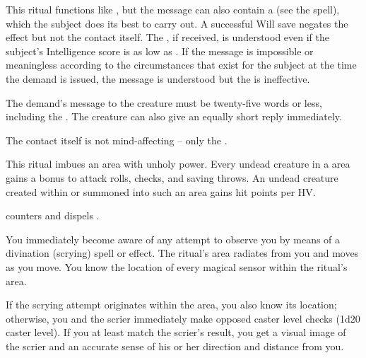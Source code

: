 \begin{spelleffect}
This ritual functions like , but the message can also contain a  (see the  spell), which the subject does its best to carry out. A successful Will save negates the  effect but not the contact itself. The , if received, is understood even if the subject's Intelligence score is as low as . If the message is impossible or meaningless according to the circumstances that exist for the subject at the time the demand is issued, the message is understood but the  is ineffective.
\par The demand's message to the creature must be twenty-five words or less, including the . The creature can also give an equally short reply immediately.
\end{spelleffect}
\begin{spellnotes}
The contact itself is not mind-affecting -- only the .
\end{spellnotes}

\spellrng{\rngclose}
\begin{spelleffect}
This ritual imbues an area with unholy power. Every undead creature in a  area gains a  bonus to attack rolls, checks, and saving throws. An undead creature created within or summoned into such an area gains  hit points per HV.
\end{spelleffect}
\begin{spellnotes}
 counters and dispels .
\end{spellnotes}

\spelldur{\durext}
\begin{spelleffect}
You immediately become aware of any attempt to observe you by means of a divination (scrying) spell or effect. The ritual's area radiates from you and moves as you move. You know the location of every magical sensor within the ritual's area.
\par If the scrying attempt originates within the area, you also know its location; otherwise, you and the scrier immediately make opposed caster level checks (1d20 \add caster level). If you at least match the scrier's result, you get a visual image of the scrier and an accurate sense of his or her direction and distance from you.
\end{spelleffect}

